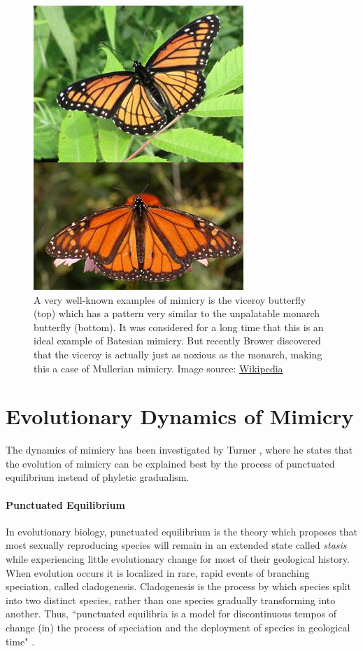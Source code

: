 \begin{figure}[H]
	\centering
	\includegraphics[scale=0.75]{images/BatesMimButter}
	\caption{A very well-known examples of mimicry is the viceroy butterfly (top) which has a pattern very similar to the unpalatable monarch butterfly (bottom). It was considered for a long time that this is an ideal example of Batesian mimicry. But recently Brower discovered that the viceroy is actually just as noxious as the monarch, making this a case of Mullerian mimicry. \cite{brower1991} Image source: \href{http://en.wikipedia.org/wiki/Mullerian_mimicry}{Wikipedia}}
	\label{fig:mullerian-butterfly}
\end{figure}

\section{Evolutionary Dynamics of Mimicry}
\label{sec:evolutionary-dynamics-of-mimicry}
The dynamics of mimicry has been investigated by Turner \cite{turner1988}, where he states that the evolution of mimicry can be explained best by the process of punctuated equilibrium instead of phyletic gradualism. 

\paragraph{Punctuated Equilibrium}
In evolutionary biology, punctuated equilibrium is the theory which proposes that most sexually reproducing species will remain in an extended state called \textit{stasis} while experiencing little evolutionary change for most of their geological history. When evolution occurs it is localized in rare, rapid events of branching speciation, called cladogenesis. Cladogenesis is the process by which species split into two distinct species, rather than one species gradually transforming into another. Thus, ``punctuated equilibria is a model for discontinuous tempos of change (in) the process of speciation and the deployment of species in geological time" \cite{gould1977}. 

